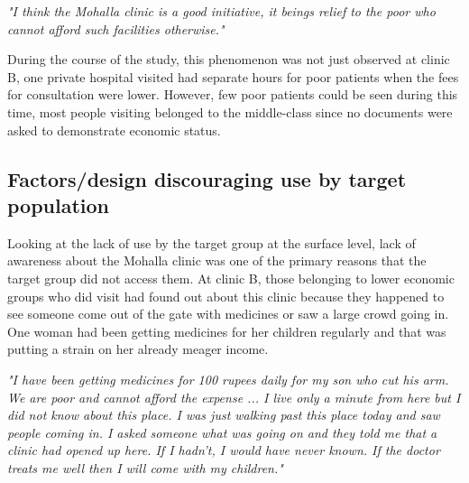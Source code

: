 \textit{"I think the Mohalla clinic is a good initiative, it beings relief to the poor who cannot afford such facilities otherwise."}

During the course of the study, this phenomenon was not just observed at clinic B, one private hospital visited had separate hours for poor patients when the fees for consultation were lower. However, few poor patients could be seen during this time, most people visiting belonged to the middle-class since no documents were asked to demonstrate economic status.
\subsection{Factors/design discouraging use by target population} %
Looking at the lack of use by the target group at the surface level, lack of awareness about the Mohalla clinic was one of the primary reasons that the target group did not access them. At clinic B, those belonging to lower economic groups who did visit had found out about this clinic because they happened to see someone come out of the gate with medicines or saw a large crowd going in. One woman had been getting medicines for her children regularly and that was putting a strain on her already meager income. 

\textit{"I have been getting medicines for 100 rupees daily for my son who cut his arm. We are poor and cannot afford the expense ... I live only a minute from here but I did not know about this place. I was just walking past this place today and saw people coming in. I asked someone what was going on and they told me that a clinic had opened up here. If I hadn't, I would have never known. If the doctor treats me well then I will come with my children."}

